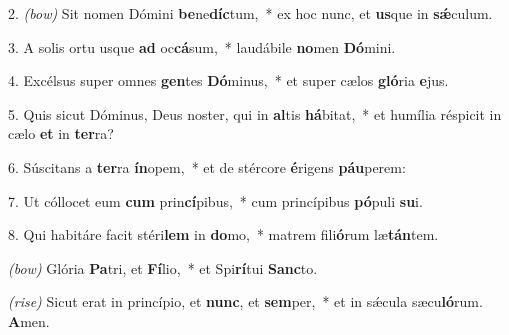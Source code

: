  2. \textit{(bow)} Sit nomen Dómini \textbf{be}ne\-\textbf{díc}tum,~*
	ex hoc nunc, et \textbf{us}que in \textbf{s\'{\ae}}culum.

 3. A solis ortu usque \textbf{ad} oc\textbf{cá}sum,~*
	laudábile \textbf{no}men \textbf{Dó}mini.

 4. Excélsus super omnes \textbf{gen}tes \textbf{Dó}\-minus,~*
	et super cælos \textbf{gló}ria \textbf{e}jus.

 5. Quis sicut Dóminus, Deus noster, qui in \textbf{al}tis \textbf{há}bitat,~*
	et humília réspicit in cælo \textbf{et} in \textbf{ter}ra?

 6. Súscitans a \textbf{ter}ra \textbf{ín}opem,~*
	et de stércore \textbf{é}rigens \textbf{páu}perem:

 7. Ut cóllocet eum \textbf{cum} prin\textbf{cí}pi\-bus,~*
	cum princípibus \textbf{pó}puli \textbf{su}i.

 8. Qui habitáre facit stéri\textbf{lem} in \textbf{do}\-mo,~*
	matrem fili\textbf{ó}rum læ\textbf{tán}tem.
	
\textit{(bow)} Glória \textbf{Pa}tri, et \textbf{Fí}lio,~*
	et Spi\textbf{rí}tui \textbf{Sanc}to.

\textit{(rise)}  Sicut erat in princípio, et \textbf{nunc}, et \textbf{sem}per,~*
	et in s\'{\ae}cula sæcu\textbf{ló}rum. \textbf{A}men.